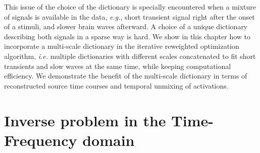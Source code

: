This issue of the choice of the dictionary is specially encountered when a mixture of signals is available in the data, \textit{e.g.}, short transient signal right after the onset of a stimuli, and slower brain waves afterward. A choice of a unique dictionary describing both signals in a sparse way is hard. We show in this chapter how to incorporate a multi-scale dictionary in the iterative reweighted optimization algorithm, \textit{i.e.} multiple dictionaries with different scales concatenated to fit short transients and slow waves at the same time, while keeping computational efficiency. %
We demonstrate the benefit of the multi-scale dictionary in terms of reconstructed source time courses and temporal unmixing of activations.


\section{Inverse problem in the Time-Frequency domain} \label{irtfmxne}

